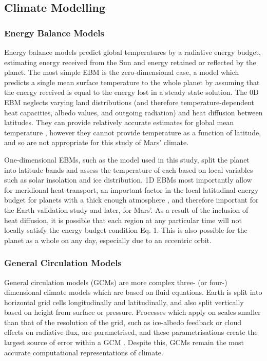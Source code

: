 \documentclass[12pt,onecolumn]{revtex4-2}    %
\begin{document}
\subsection{Climate Modelling}

\subsubsection{Energy Balance Models}
Energy balance models predict global temperatures by a radiative energy budget, estimating energy received from the Sun and energy retained or reflected by the planet. The most simple EBM is the zero-dimensional case, a model which predicts a single mean surface temperature to the whole planet by assuming that the energy received is equal to the energy lost in a steady state solution. The 0D EBM neglects varying land distributions (and therefore temperature-dependent heat capacities, albedo values, and outgoing radiation) and heat diffusion between latitudes. They can provide relatively accurate estimates for global mean temperature \cite{L20}, however they cannot provide temperature as a function of latitude, and so are not appropriate for this study of Mars' climate.
\

One-dimensional EBMs, such as the model used in this study, split the planet into latitude bands and assess the temperature of each based on local variables such as solar insolation and ice distribution. 1D EBMs most importantly allow for meridional heat transport, an important factor in the local latitudinal energy budget for planets with a thick enough atmosphere \cite{SMS08}, and therefore important for the Earth validation study and later, for Mars'. As a result of the inclusion of heat diffusion, it is possible that each region at any particular time will not locally satisfy the energy budget condition Eq. 1. This is also possible for the planet as a whole on any day, especially due to an eccentric orbit. %

\subsubsection{General Circulation Models}

General circulation models (GCMs) are more complex three- (or four-) dimensional climate models which are based on fluid equations. Earth is split into horizontal grid cells longitudinally and latitudinally, and also split vertically based on height from surface or pressure. Processes which apply on scales smaller than that of the resolution of the grid, such as ice-albedo feedback or cloud effects on radiative flux, are parametrised, and these parametrisations create the largest source of error within a GCM \cite{CBZH}. Despite this, GCMs remain the most accurate computational representations of climate.
\
\end{document}
